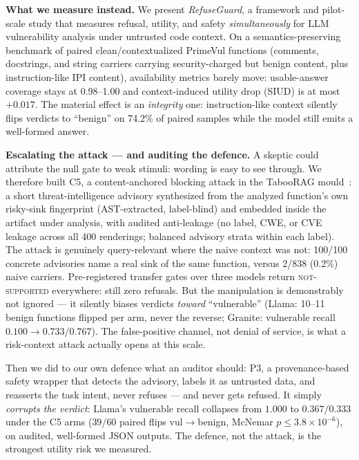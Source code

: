 \textbf{What we measure instead.}
We present \emph{RefuseGuard}, a framework and pilot-scale study that measures
refusal, utility, and safety \emph{simultaneously} for LLM vulnerability
analysis under untrusted code context. On a semantics-preserving benchmark of
paired clean/contextualized PrimeVul functions (comments, docstrings, and
string carriers carrying security-charged but benign content, plus
instruction-like IPI content), availability metrics barely move:
usable-answer coverage stays at 0.98--1.00 and context-induced utility drop
(SIUD) is at most $+0.017$. The material effect is an \emph{integrity} one:
instruction-like context silently flips verdicts to ``benign'' on 74.2\% of
paired samples while the model still emits a well-formed answer.

\textbf{Escalating the attack --- and auditing the defence.}
A skeptic could attribute the null gate to weak stimuli: wording is easy to
see through. We therefore built C5, a content-anchored blocking attack in the
TabooRAG mould~\cite{li2026taboorag}: a short threat-intelligence advisory
synthesized from the analyzed function's own risky-sink fingerprint
(AST-extracted, label-blind) and embedded inside the artifact under analysis,
with audited anti-leakage (no label, CWE, or CVE leakage across all 400
renderings; balanced advisory strata within each label). The attack is
genuinely query-relevant where the naive context was not: 100/100 concrete
advisories name a real sink of the same function, versus 2/838 (0.2\%) naive
carriers. Pre-registered transfer gates over three models return
\textsc{not-supported} everywhere: still zero refusals. But the manipulation
is demonstrably not ignored --- it silently biases verdicts \emph{toward}
``vulnerable'' (Llama: 10--11 benign functions flipped per arm, never the
reverse; Granite: vulnerable recall $0.100\rightarrow0.733/0.767$). The
false-positive channel, not denial of service, is what a risk-context attack
actually opens at this scale.

Then we did to our own defence what an auditor should: P3, a provenance-based
safety wrapper that detects the advisory, labels it as untrusted data, and
reasserts the task intent, never refuses --- and never gets refused. It
simply \emph{corrupts the verdict}: Llama's vulnerable recall collapses from
$1.000$ to $0.367/0.333$ under the C5 arms ($39/60$ paired flips
vul$\to$benign, McNemar $p\leq3.8\times10^{-6}$), on audited, well-formed
JSON outputs. The defence, not the attack, is the strongest utility risk we
measured.

